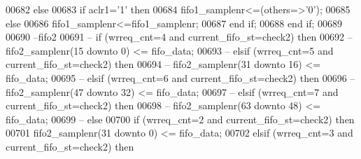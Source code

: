 \begin{DoxyCode}
00682           \textcolor{keywordflow}{else} 
00683             \textcolor{keywordflow}{if} \textcolor{vhdlchar}{aclr1}\textcolor{vhdlchar}{=}\textcolor{vhdlchar}{'}\textcolor{vhdllogic}{}\textcolor{vhdllogic}{1}\textcolor{vhdlchar}{'} \textcolor{keywordflow}{then} 
00684               \textcolor{vhdlchar}{fifo1_samplenr}\textcolor{vhdlchar}{<=}\textcolor{vhdlchar}{(}\textcolor{keywordflow}{others}\textcolor{vhdlchar}{=}\textcolor{vhdlchar}{>}\textcolor{vhdlchar}{'}\textcolor{vhdllogic}{}\textcolor{vhdllogic}{0}\textcolor{vhdlchar}{'}\textcolor{vhdlchar}{)};
00685             \textcolor{keywordflow}{else} 
00686               \textcolor{vhdlchar}{fifo1_samplenr}\textcolor{vhdlchar}{<=}\textcolor{vhdlchar}{fifo1_samplenr};
00687             \textcolor{keywordflow}{end} \textcolor{keywordflow}{if};
00688           \textcolor{keywordflow}{end} \textcolor{keywordflow}{if};
00689           
00690 \textcolor{keyword}{          --fifo2           }
00691 \textcolor{keyword}{--        if (wrreq\_cnt=4 and current\_fifo\_st=check2) then }
00692 \textcolor{keyword}{--          fifo2\_samplenr(15 downto 0) <= fifo\_data;}
00693 \textcolor{keyword}{--        elsif (wrreq\_cnt=5 and current\_fifo\_st=check2) then}
00694 \textcolor{keyword}{--          fifo2\_samplenr(31 downto 16) <= fifo\_data;}
00695 \textcolor{keyword}{--        elsif (wrreq\_cnt=6 and current\_fifo\_st=check2) then}
00696 \textcolor{keyword}{--          fifo2\_samplenr(47 downto 32) <= fifo\_data; }
00697 \textcolor{keyword}{--        elsif (wrreq\_cnt=7 and current\_fifo\_st=check2) then}
00698 \textcolor{keyword}{--          fifo2\_samplenr(63 downto 48) <= fifo\_data; }
00699 \textcolor{keyword}{--        else}
00700           \textcolor{keywordflow}{if} \textcolor{vhdlchar}{(}\textcolor{vhdlchar}{wrreq_cnt}\textcolor{vhdlchar}{=}\textcolor{vhdllogic}{}\textcolor{vhdllogic}{2} \textcolor{keywordflow}{and} \textcolor{vhdlchar}{current_fifo_st}\textcolor{vhdlchar}{=}\textcolor{vhdlchar}{check2}\textcolor{vhdlchar}{)} \textcolor{keywordflow}{then} 
00701             \textcolor{vhdlchar}{fifo2_samplenr}\textcolor{vhdlchar}{(}\textcolor{vhdllogic}{}\textcolor{vhdllogic}{31} \textcolor{keywordflow}{downto} \textcolor{vhdllogic}{}\textcolor{vhdllogic}{0}\textcolor{vhdlchar}{)} \textcolor{vhdlchar}{<=} \textcolor{vhdlchar}{fifo_data};
00702           \textcolor{keywordflow}{elsif} \textcolor{vhdlchar}{(}\textcolor{vhdlchar}{wrreq_cnt}\textcolor{vhdlchar}{=}\textcolor{vhdllogic}{}\textcolor{vhdllogic}{3} \textcolor{keywordflow}{and} \textcolor{vhdlchar}{current_fifo_st}\textcolor{vhdlchar}{=}\textcolor{vhdlchar}{check2}\textcolor{vhdlchar}{)} \textcolor{keywordflow}{then}

\end{DoxyCode}
